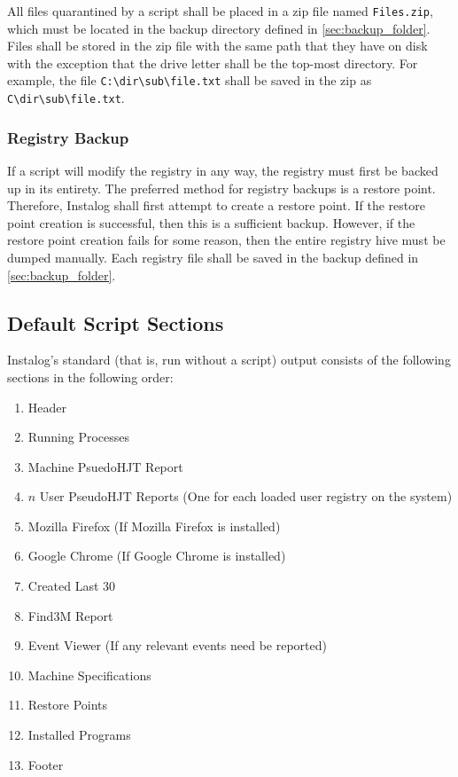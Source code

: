 All files quarantined by a script shall be placed in a zip file named
\verb|Files.zip|, which must be located in the backup directory defined in
\ref{sec:backup_folder}.  Files shall be stored in the zip file with the same
path that they have on disk with the exception that the drive letter shall be
the top-most directory.  For example, the file \verb|C:\dir\sub\file.txt| shall
be saved in the zip as \verb|C\dir\sub\file.txt|.
\subsubsection{Registry Backup} 
If a script will modify the registry in any way, the registry must first be
backed up in its entirety.  The preferred method for registry backups is a
restore point.  Therefore, Instalog shall first attempt to create a restore
point.  If the restore point creation is successful, then this is a sufficient
backup.  However, if the restore point creation fails for some reason, then the
entire registry hive must be dumped manually.  Each registry file shall be saved
in the backup defined in \ref{sec:backup_folder}.

\subsection{Default Script Sections} \label{sec:default_script_sections}
Instalog's standard (that is, run without a script) output consists of the
following sections in the following order:
\begin{enumerate}
    \item Header
    \item Running Processes
    \item Machine PsuedoHJT Report
    \item $n$ User PseudoHJT Reports (One for each loaded user registry on the
    system)
    \item Mozilla Firefox (If Mozilla Firefox is installed)
    \item Google Chrome (If Google Chrome is installed)
    \item Created Last 30
    \item Find3M Report
    \item Event Viewer (If any relevant events need be reported)
    \item Machine Specifications
    \item Restore Points
    \item Installed Programs
    \item Footer
\end{enumerate}


